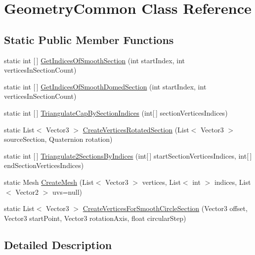 \hypertarget{class_geometry_common}{}\section{Geometry\+Common Class Reference}
\label{class_geometry_common}
\subsection*{Static Public Member Functions}
\begin{DoxyCompactItemize}
\item 
static int \mbox{[}$\,$\mbox{]} \mbox{\hyperlink{class_geometry_common_a9dab84938cd8a24192b3552022819daa}{Get\+Indices\+Of\+Smooth\+Section}} (int start\+Index, int vertices\+In\+Section\+Count)
\item 
static int \mbox{[}$\,$\mbox{]} \mbox{\hyperlink{class_geometry_common_a1f4f9acf5a00f335f85282261a31fd3c}{Get\+Indices\+Of\+Smooth\+Domed\+Section}} (int start\+Index, int vertices\+In\+Section\+Count)
\item 
static int \mbox{[}$\,$\mbox{]} \mbox{\hyperlink{class_geometry_common_af7e0cdd1981d96161e9169449808b8a4}{Triangulate\+Cap\+By\+Section\+Indices}} (int\mbox{[}$\,$\mbox{]} section\+Vertices\+Indices)
\item 
static List$<$ Vector3 $>$ \mbox{\hyperlink{class_geometry_common_af2330eeb38210494e38fd37e4cba2809}{Create\+Vertices\+Rotated\+Section}} (List$<$ Vector3 $>$ source\+Section, Quaternion rotation)
\item 
static int \mbox{[}$\,$\mbox{]} \mbox{\hyperlink{class_geometry_common_aa6a96089933023f69fffeb799c87debb}{Triangulate2\+Sections\+By\+Indices}} (int\mbox{[}$\,$\mbox{]} start\+Section\+Vertices\+Indices, int\mbox{[}$\,$\mbox{]} end\+Section\+Vertices\+Indices)
\item 
static Mesh \mbox{\hyperlink{class_geometry_common_a384bdf59b9cedb2ff13f7cd71db2663c}{Create\+Mesh}} (List$<$ Vector3 $>$ vertices, List$<$ int $>$ indices, List$<$ Vector2 $>$ uvs=null)
\item 
static List$<$ Vector3 $>$ \mbox{\hyperlink{class_geometry_common_adee2a9a148bfcd203fa8cf5a698e5dfc}{Create\+Vertices\+For\+Smooth\+Circle\+Section}} (Vector3 offset, Vector3 start\+Point, Vector3 rotation\+Axis, float circular\+Step)
\end{DoxyCompactItemize}


\subsection{Detailed Description}



